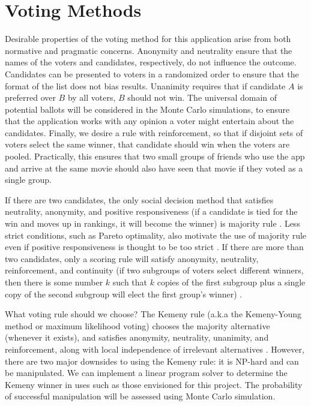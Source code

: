 \documentclass{article}
\begin{document}
\section{Voting Methods}


Desirable properties of the voting method for this application arise from both normative and pragmatic concerns. Anonymity and neutrality ensure that the names of the voters and candidates, respectively, do not influence the outcome. Candidates can be presented to voters in a randomized order to ensure that the format of the list does not bias results. Unanimity requires that if candidate $A$ is preferred over $B$ by all voters, $B$ should not win. The universal domain of potential ballots will be considered in the Monte Carlo simulations, to ensure that the application works with any opinion a voter might entertain about the candidates. Finally, we desire a rule with reinforcement, so that if disjoint sets of voters select the same winner, that candidate should win when the voters are pooled. Practically, this ensures that two small groups of friends who use the app and arrive at the same movie should also have seen that movie if they voted as a single group.

If there are two candidates, the only social decision method that satisfies neutrality, anonymity, and positive responsiveness (if a candidate is tied for the win and moves up in rankings, it will become the winner) is majority rule \citep{may1952}. Less strict conditions, such as Pareto optimality, also motivate the use of majority rule even if positive responsiveness is thought to be too strict \citep{acsan2002,j2003majority}. If there are more than two candidates, only a scoring rule will satisfy anonymity, neutrality, reinforcement, and continuity (if two subgroups of voters select different winners, then there is some number $k$ such that $k$ copies of the first subgroup plus a single copy of the second subgroup will elect the first group's winner) \citep{young1975}. 

What voting rule should we choose? The Kemeny rule (a.k.a the Kemeny-Young method or maximum likelihood voting) chooses the majority alternative (whenever it exists), and satisfies anonymity, neutrality, unanimity, and reinforcement, along with local independence of irrelevant alternatives \citep{kemeny1959,young1978,young1995}. However, there are two major downsides to using the Kemeny rule: it is NP-hard \citep{conitzer2006improved,davenport2004} and can be manipulated. We can implement a linear program solver to determine the Kemeny winner in uses such as those envisioned for this project. The probability of successful manipulation will be assessed using Monte Carlo simulation.
\end{document}
